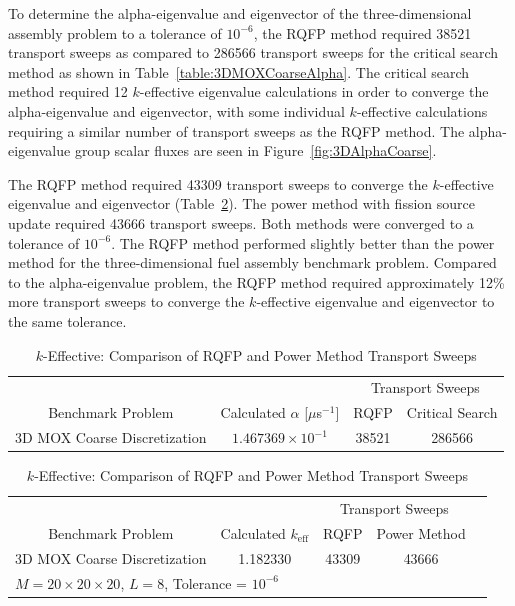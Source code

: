 \clearpage

To determine the alpha-eigenvalue and eigenvector of the three-dimensional assembly problem to a tolerance of $10^{-6}$, the RQFP method required 38521 transport sweeps as compared to 286566 transport sweeps for the critical search method as shown in Table~\ref{table:3DMOXCoarseAlpha}. The critical search method required 12 $k$-effective eigenvalue calculations in order to converge the alpha-eigenvalue and eigenvector, with some individual $k$-effective calculations requiring a similar number of transport sweeps as the RQFP method. The alpha-eigenvalue group scalar fluxes are seen in Figure~\ref{fig:3DAlphaCoarse}.

The RQFP method required 43309 transport sweeps to converge the $k$-effective eigenvalue and eigenvector (Table~\ref{table:3DMOXCoarseK}). The power method with fission source update required 43666 transport sweeps. Both methods were converged to a tolerance of $10^{-6}$. The RQFP method performed slightly better than the power method for the three-dimensional fuel assembly benchmark problem. Compared to the alpha-eigenvalue problem, the RQFP method required approximately 12\% more transport sweeps to converge the $k$-effective eigenvalue and eigenvector to the same tolerance.

\begin{table}[!htbp]
	\caption{Calculated Eigenvalues and Transport Sweep Comparisons for Three-Dimensional MOX Fuel Core with Coarse Spatial Discretization}
	\label{table:3DMOXCoarseRes}
	\begin{subtable}[h]{1.0\textwidth}
	\centering{}
	\begin{tabular}{@{}cccc@{}}\toprule
	& & \multicolumn{2}{c}{Transport Sweeps} \\
	\cmidrule{3-4} Benchmark Problem & Calculated $\alpha$ [$\mu$s$^{-1}$] & RQFP & Critical Search\\
	\midrule
	3D MOX Coarse Discretization & $1.467369 \times 10^{-1}$ & 38521 & 286566 \\
	\bottomrule
	\end{tabular}
	\caption{Alpha-Eigenvalue: Comparison of RQFP and Critical Search Transport Sweeps}
	\label{table:3DMOXCoarseAlpha}
	\end{subtable}%
	\vspace{0.25cm}
	\begin{subtable}[h]{1.0\textwidth}
	\centering{}
	\begin{tabular}{@{}ccccc@{}}\toprule
	& & \multicolumn{2}{c}{Transport Sweeps} \\
	\cmidrule{3-4} Benchmark Problem & Calculated $k_{\text{eff}}$ & RQFP & Power Method \\
	\midrule
	3D MOX Coarse Discretization & 1.182330 & 43309 & 43666 \\
	\bottomrule
	\multicolumn{4}{l}{$M = 20 \times 20 \times 20$, $L = 8$, Tolerance = $10^{-6}$} \\
	\end{tabular}
	\caption{$k$-Effective: Comparison of RQFP and Power Method Transport Sweeps}
	\label{table:3DMOXCoarseK}
	\end{subtable}
\end{table}

